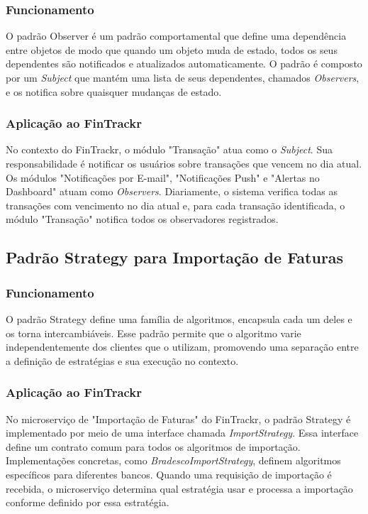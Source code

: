 \subsubsection*{Funcionamento}
O padrão Observer é um padrão comportamental que define uma dependência entre objetos de modo que quando um objeto muda de estado, todos os seus dependentes são notificados e atualizados automaticamente. O padrão é composto por um \textit{Subject} que mantém uma lista de seus dependentes, chamados \textit{Observers}, e os notifica sobre quaisquer mudanças de estado.

\subsubsection*{Aplicação ao FinTrackr}
No contexto do FinTrackr, o módulo "Transação" atua como o \textit{Subject}. Sua responsabilidade é notificar os usuários sobre transações que vencem no dia atual. Os módulos "Notificações por E-mail", "Notificações Push" e "Alertas no Dashboard" atuam como \textit{Observers}. Diariamente, o sistema verifica todas as transações com vencimento no dia atual e, para cada transação identificada, o módulo "Transação" notifica todos os observadores registrados.

\subsection*{Padrão Strategy para Importação de Faturas}

\subsubsection*{Funcionamento}
O padrão Strategy define uma família de algoritmos, encapsula cada um deles e os torna intercambiáveis. Esse padrão permite que o algoritmo varie independentemente dos clientes que o utilizam, promovendo uma separação entre a definição de estratégias e sua execução no contexto.

\subsubsection*{Aplicação ao FinTrackr}
No microserviço de "Importação de Faturas" do FinTrackr, o padrão Strategy é implementado por meio de uma interface chamada \textit{ImportStrategy}. Essa interface define um contrato comum para todos os algoritmos de importação. Implementações concretas, como \textit{BradescoImportStrategy}, definem algoritmos específicos para diferentes bancos. Quando uma requisição de importação é recebida, o microserviço determina qual estratégia usar e processa a importação conforme definido por essa estratégia.

